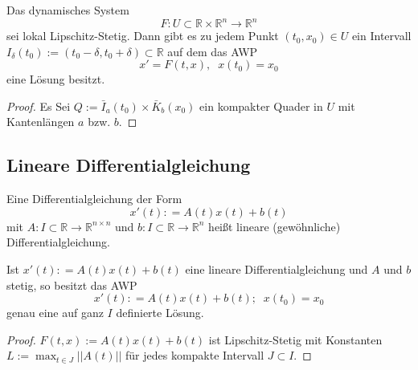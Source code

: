 \begin{Satz}
Das dynamisches System  $$F : U \subset \mathbb{R} \times \mathbb{R}^n \to \mathbb{R}^n$$ sei lokal Lipschitz-Stetig. 
Dann gibt es zu jedem Punkt $(t_0, x_0) \in U$ ein Intervall $I_\delta (t_0) := (t_0 - \delta, t_0 + \delta) \subset \mathbb{R}$ auf dem das AWP 
$$ x' = F(t,x), \; \; x(t_0) = x_0$$
eine Lösung besitzt.
\end{Satz}
\begin{proof}
Es Sei $Q := \bar{I}_a(t_0) \times \bar{K}_b(x_0)$ ein kompakter Quader in $U$ mit Kantenlängen $a$ bzw. $b$.
\end{proof}


\begin{Lemma}[Gronwall]
\end{Lemma}


\begin{Satz}[Eindeutigkeitssatz]
\end{Satz}


\subsection{Lineare Differentialgleichung}

\begin{Definition}
Eine Differentialgleichung der Form
$$ x' (t): = A(t) x(t) + b(t)$$
mit $A: I \subset \mathbb{R} \to \mathbb{R}^{n \times n}$ und $b: I \subset \mathbb{R} \to \mathbb{R}^{n}$ heißt lineare (gewöhnliche) Differentialgleichung.
\end{Definition}

\begin{Satz}
Ist $ x' (t): = A(t) x(t) + b(t)$ eine lineare Differentialgleichung und $A$ und $b$ stetig, so besitzt das AWP 
$$ x' (t): = A(t) x(t) + b(t) ; \; \; x(t_0) = x_0 $$
genau eine auf ganz $I$ definierte Lösung.
\end{Satz}

\begin{proof}
$F(t,x):= A(t) x(t) + b(t)$ ist Lipschitz-Stetig mit Konstanten $L:= \max_{t \in J}|| A(t) ||$ für jedes kompakte Intervall $J \subset I$.
\end{proof}

